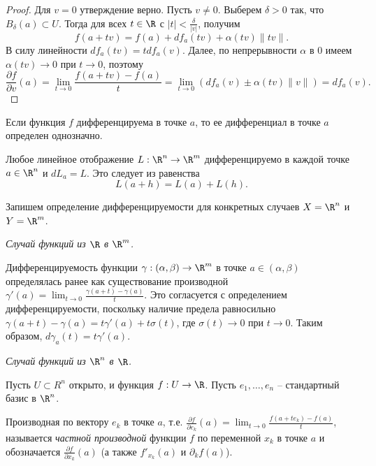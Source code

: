 \begin{proof}
    Для $v = 0$ утверждение верно. Пусть $v \neq 0$. Выберем $\delta > 0$ так, что $B_{\delta}(a) \subset U$. Тогда для всех $t \in \R$ с $|t| < \frac{\delta}{|v|}$, получим
    \[f(a + tv) = f(a) + df_{a}(tv) + \alpha(tv)\|tv\|.\]
    В силу линейности $df_{a}(tv) = tdf_{a}(v)$. Далее, по непрерывности $\alpha$ в $0$ имеем $\alpha(tv) \to 0$ при $t \to 0$, поэтому
    \[\frac{\partial f}{\partial v}(a) = \lim_{t \to 0}\frac{f(a + tv) - f(a)}{t} = \lim_{t \to 0}(df_{a}(v) \pm \alpha(tv)\|v\|) = df_{a}(v).\]
\end{proof}

\begin{corollary}
    Если функция $f$ дифференцируема в точке $a$, то ее дифференциал в точке $a$ определен однозначно.
\end{corollary}

\begin{example}
    Любое линейное отображение $L: \R^{n} \to \R^{m}$ дифференцируемо в каждой точке $a \in \R^{n}$ и $dL_{a} = L$. Это следует из равенства
    \[L(a + h) = L(a) + L(h).\]
\end{example}

Запишем определение дифференцируемости для конкретных случаев $X = \R^{n}$ и $Y = \R^{m}$.

\textit{Случай функций из $\R$ в $\R^{m}$.}

Дифференцируемость функции $\gamma : (\alpha, \beta) \to \R^{m}$ в точке $a \in (\alpha, \beta)$ определялась ранее как существование производной $\gamma'(a) = \lim_{t \to 0}\frac{\gamma(a + t) - \gamma(a)}{t}$. Это согласуется с определением дифференцируемости, поскольку наличие предела равносильно $\gamma(a + t) - \gamma(a) = t \gamma'(a) + t\sigma(t)$, где $\sigma(t) \to 0$ при $t \to 0$. Таким образом, $d\gamma_{a}(t) = t\gamma'(a)$.

\textit{Случай функций из $\R^{n}$ в $\R$.}

Пусть $U \subset R^{n}$ открыто, и функция $f: U \to \R$. Пусть $e_{1}, \ldots, e_{n}$ -- стандартный базис в $\R^{n}$.

\begin{definition}
    Производная по вектору $e_{k}$ в точке $a$, т.е. $\frac{\partial f}{\partial e_{k}}(a) = \lim_{t \to 0}\frac{f(a + t e_{k}) - f(a)}{t}$, называется \textit{частной производной} функции $f$ по переменной $x_{k}$ в точке $a$ и обозначается $\frac{\partial f}{\partial x_{k}}(a)$ (а также $f'_{x_{k}}(a)$ и $\partial_{k}f(a)$).
\end{definition}

